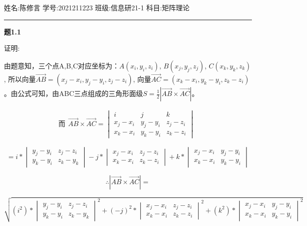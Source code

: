 \documentclass[UTF8]{ctexrep}
\begin{document}
{\noindent}姓名:陈修言 \quad 学号:2021211223 \quad 班级:信息研21-1 \quad 科目:矩阵理论

{\noindent}\rule{\textwidth}{0.05em}

{\noindent}\textbf{题1.1}

证明:

由题意知，三个点A,B,C对应坐标为：$A(x_i, y_i, z_i)$, $B(x_j, y_j, z_j)$, $C(x_k, y_k, z_k)$,
所以向量$\overrightarrow{AB} = (x_j-x_i, y_j-y_i, z_j-z_i)$, 向量$\overrightarrow{AC} = (x_k-x_i, y_k-y_i, z_k-z_i)$。由公式可知，由ABC三点组成的三角形面级$S = \frac{1}{2}\left|\overrightarrow{AB} \times \overrightarrow{AC} \right|$。

$$
    \text{而}\begin{gathered}
        \overrightarrow{AB} \times \overrightarrow{AC} =
        \begin{vmatrix}
            i       & j       & k       \\
            x_j-x_i & y_j-y_i & z_j-z_i \\
            x_k-x_i & y_k-y_i & z_k-z_i
        \end{vmatrix}
    \end{gathered}
$$

$$
    = i* \begin{vmatrix}
        y_j-y_i & z_j-z_i \\
        y_k-y_i & z_k-y_k
    \end{vmatrix} - j* \begin{vmatrix}
        x_j-x_i & z_j-z_i \\
        x_k-x_i & z_k-z_i
    \end{vmatrix} + k * \begin{vmatrix}
        x_j-x_i & y_j-y_i \\
        x_k-x_i & y_k-y_i
    \end{vmatrix}
$$

$$
    \therefore |\overrightarrow{AB}\times\overrightarrow{AC}| =
$$

$$
    \sqrt{(i^2) * \begin{vmatrix}
            y_j-y_i & z_j-z_i \\
            y_k-y_i & z_k-y_k
        \end{vmatrix} ^2 + (-j)^2 * \begin{vmatrix}
            x_j-x_i & z_j-z_i \\
            x_k-x_i & z_k-z_i
        \end{vmatrix} ^2 + (k^2) * \begin{vmatrix}
            x_j-x_i & y_j-y_i \\
            x_k-x_i & y_k-y_i
        \end{vmatrix}^2}
$$
\end{document}
